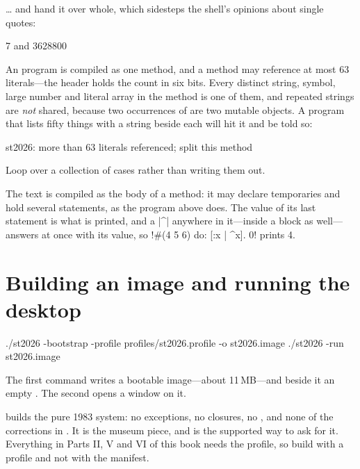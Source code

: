\ldots{} and hand it over whole, which sidesteps the shell's opinions about
single quotes:


\begin{plain}
7 and 3628800
\end{plain}

\begin{stnote}
An  program is compiled as one method, and a method may reference
at most 63 literals---the header holds the count in six bits. Every distinct
string, symbol, large number and literal array in the method is one of them,
and repeated strings are \emph{not} shared, because two occurrences of
 are two mutable objects. A program that lists fifty things with a
string beside each will hit it and be told so:

\begin{plain}
st2026: more than 63 literals referenced; split this method
\end{plain}

Loop over a collection of cases rather than writing them out.
\end{stnote}

The text is compiled as the body of a method: it may declare temporaries and
hold several statements, as the program above does. The value of its last
statement is what is printed, and a \ct|^| anywhere in it---inside a block as
well---answers at once with its value, so \ct!#(4 5 6) do: [:x | ^x]. 0! prints
4.

\section{Building an image and running the desktop}

\begin{sh}
./st2026 -bootstrap -profile profiles/st2026.profile -o st2026.image
./st2026 -run st2026.image
\end{sh}

The first command writes a bootable image---about 11\,MB---and beside it
an empty . The second opens a window on it.

\begin{stwarn}
 builds the pure 1983 system: no exceptions,
no closures, no , and none of the corrections in . It is
the museum piece, and  is the supported way to
ask for it. Everything in Parts II, V and VI of this book needs the
 profile, so build with a profile and not with the manifest.
\end{stwarn}

